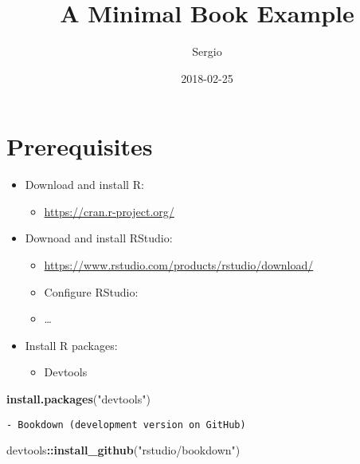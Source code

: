 \documentclass[]{book}
\title{A Minimal Book Example}
\author{Sergio}
\date{2018-02-25}
\newenvironment{Shaded}{\begin{snugshade}}{\end{snugshade}}
\newcommand{\KeywordTok}[1]{\textcolor[rgb]{0.13,0.29,0.53}{\textbf{#1}}}
\newcommand{\StringTok}[1]{\textcolor[rgb]{0.31,0.60,0.02}{#1}}
\newcommand{\OperatorTok}[1]{\textcolor[rgb]{0.81,0.36,0.00}{\textbf{#1}}}
\newcommand{\NormalTok}[1]{#1}
\providecommand{\tightlist}{%
  \setlength{\itemsep}{0pt}\setlength{\parskip}{0pt}}
\theoremstyle{definition}
\theoremstyle{definition}
\theoremstyle{definition}
\theoremstyle{remark}
\begin{document}
\maketitle

{
\setcounter{tocdepth}{1}
\tableofcontents
}
\chapter{Prerequisites}\label{prerequisites}

\begin{itemize}
\tightlist
\item
  Download and install R:

  \begin{itemize}
  \tightlist
  \item
    \url{https://cran.r-project.org/}
  \end{itemize}
\item
  Downoad and install RStudio:

  \begin{itemize}
  \tightlist
  \item
    \url{https://www.rstudio.com/products/rstudio/download/}\\
  \item
    Configure RStudio:\\
  \item
    \ldots{}
  \end{itemize}
\item
  Install R packages:

  \begin{itemize}
  \tightlist
  \item
    Devtools
  \end{itemize}
\end{itemize}

\begin{Shaded}
\begin{Highlighting}[]
\KeywordTok{install.packages}\NormalTok{(}\StringTok{"devtools"}\NormalTok{)  }
\end{Highlighting}
\end{Shaded}

\begin{verbatim}
- Bookdown (development version on GitHub)  
\end{verbatim}

\begin{Shaded}
\begin{Highlighting}[]
\NormalTok{devtools}\OperatorTok{::}\KeywordTok{install_github}\NormalTok{(}\StringTok{"rstudio/bookdown"}\NormalTok{)}
\end{Highlighting}
\end{Shaded}
\end{document}
